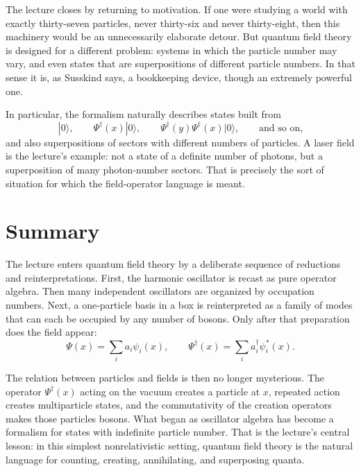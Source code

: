 The lecture closes by returning to motivation. If one were studying a world with exactly thirty-seven particles, never thirty-six and never thirty-eight, then this machinery would be an unnecessarily elaborate detour. But quantum field theory is designed for a different problem: systems in which the particle number may vary, and even states that are superpositions of different particle numbers. In that sense it is, as Susskind says, a bookkeeping device, though an extremely powerful one.

In particular, the formalism naturally describes states built from
\[
|0\rangle,\qquad
\Psi^\dagger(x)|0\rangle,\qquad
\Psi^\dagger(y)\Psi^\dagger(x)|0\rangle,
\qquad \text{and so on,}
\]
and also superpositions of sectors with different numbers of particles. A laser field is the lecture's example: not a state of a definite number of photons, but a superposition of many photon-number sectors. That is precisely the sort of situation for which the field-operator language is meant.

\section{Summary}

The lecture enters quantum field theory by a deliberate sequence of reductions and reinterpretations. First, the harmonic oscillator is recast as pure operator algebra. Then many independent oscillators are organized by occupation numbers. Next, a one-particle basis in a box is reinterpreted as a family of modes that can each be occupied by any number of bosons. Only after that preparation does the field appear:
\begin{equation}
\Psi(x)=\sum_i a_i\psi_i(x),
\qquad
\Psi^\dagger(x)=\sum_i a_i^\dagger\psi_i^*(x).
\end{equation}

The relation between particles and fields is then no longer mysterious. The operator \(\Psi^\dagger(x)\) acting on the vacuum creates a particle at \(x\), repeated action creates multiparticle states, and the commutativity of the creation operators makes those particles bosons. What began as oscillator algebra has become a formalism for states with indefinite particle number. That is the lecture's central lesson: in this simplest nonrelativistic setting, quantum field theory is the natural language for counting, creating, annihilating, and superposing quanta.